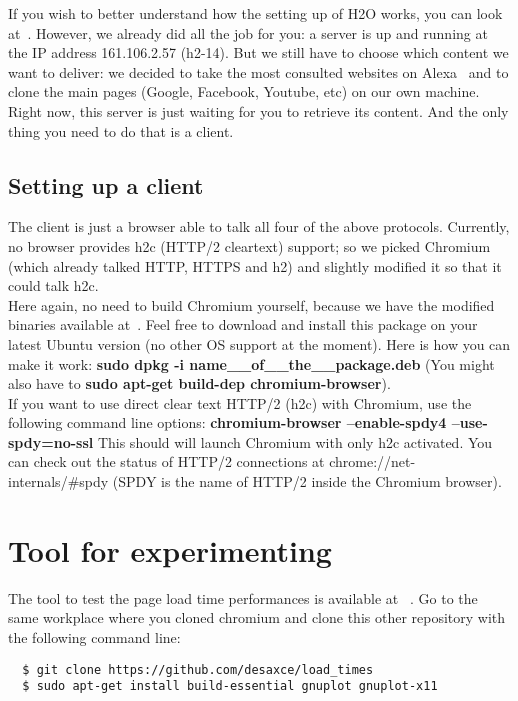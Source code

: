 \documentclass[12pt, notitlepage]{article}
\begin{document}
If you wish to better understand how the setting up of H2O works, you
can look at~\cite{h2o}. However, we already did all the job for you: a
server is up and running at the IP address 161.106.2.57 (h2-14).
But we still have to choose which content we want to 
deliver: we decided to take the most consulted websites on
Alexa~\cite{alexa} and to clone the main pages (Google, Facebook, Youtube,
etc) on our own machine.
Right now, this server is just waiting for you to
retrieve its content. And the only thing you need to do that is a client.

\subsection{Setting up a client}

The client is just a browser able to talk all four of the above 
protocols. Currently, no browser provides h2c (HTTP/2 cleartext) support;
so we picked Chromium (which already talked HTTP, HTTPS and h2) and
slightly modified it so that it could talk h2c.\\

\newpage
Here again, no need to build Chromium yourself, because we have the
modified binaries available at~\cite{chromium}. Feel free to download and
install this package on your latest Ubuntu version (no other OS support at 
the moment). Here is how you can make it work:
\textbf{sudo dpkg -i name\_\_of\_\_the\_\_package.deb}
(You might also have to \textbf{sudo apt-get build-dep chromium-browser}).\\

If you want to use direct clear text HTTP/2 (h2c) with Chromium, use the
following command line options:
\textbf{chromium-browser --enable-spdy4 --use-spdy=no-ssl}
This should will launch Chromium with only h2c activated. You can
check out the status of HTTP/2 connections at chrome://net-internals/\#spdy
(SPDY is the name of HTTP/2 inside the Chromium browser).

\section{Tool for experimenting}
The tool to test the page load time performances is available at
~\cite{load_times}. Go to the same workplace where you cloned chromium
and clone this other repository with the following command line: 
\begin{lstlisting}
  $ git clone https://github.com/desaxce/load_times
  $ sudo apt-get install build-essential gnuplot gnuplot-x11
\end{lstlisting}
\vspace*{0.5cm}
\end{document}
